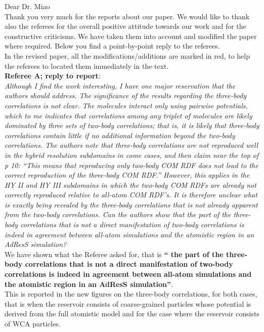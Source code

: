 \documentclass[12pt,a4paper]{article}
\begin{document}
\vspace{2cm}
Dear Dr. Miao\\
Thank you very much for the reports about our paper. We would like to thank also the referees for the overall positive attitude towards our work and for the constructive criticisms.
We have taken them into account and modified the paper where required. Below you find a point-by-point reply to the referees.\\
In the revised paper, all the modifications/additions are marked in red, to help the referees to located them immediately in the text.\\
{\bf Referee A; reply to  report}:\\
{\color{teal} {\it Although I find the work interesting, I have one major reservation that the authors should address. The
significance of the results regarding the three-body correlations is not clear. The molecules interact only
using pairwise potentials, which to me indicates that correlations among any triplet of molecules are likely
dominated by three sets of two-body correlations; that is, it is likely that three-body correlations contain
little if no additional information beyond the two-body correlations. The authors note that three-body
correlations are not reproduced well in the hybrid resolution subdomains in come cases, and then claim
near the top of p 10: “This means that reproducing only two-body COM RDF does not lead to the correct
reproduction of the three-body COM RDF.” However, this applies in the HY II and HY III subdomains in
which the two-body COM RDFs are already not correctly reproduced relative to all-atom COM RDF’s. It is
therefore unclear what is exactly being revealed by the three-body correlations that is not already apparent
from the two-body correlations. Can the authors show that the part of the three-body correlations that is
not a direct manifestation of two-body correlations is indeed in agreement between all-atom simulations
and the atomistic region in an AdResS simulation?}}\\
We have shown what the Referee asked for, that is {\bf `` the part of the three-body correlations that is
not a direct manifestation of two-body correlations is indeed in agreement between all-atom simulations
and the atomistic region in an AdResS simulation''}.\\
This is reported in the new figures on the three-body correlations, for both cases, that is when the reservoir consists of coarse-grained particles whose potential is derived from the full atomistic model and for the case where the reservoir consists of WCA particles.
\end{document}
